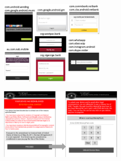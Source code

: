 \begin{figure}[t]
\centering
\begin{minipage}{.5\textwidth}
  \centering
  \includegraphics[width=2in]{fig/slembunkWindows.png}
  \label{fig:slembunkPhishingWindows}
\end{minipage}%
\begin{minipage}{.5\textwidth}
  \centering
  \includegraphics[width=2.35in]{fig/apleswindow.png}
  \vspace{.22in}
  \label{fig:apleswindow}
\end{minipage}
\end{figure}

